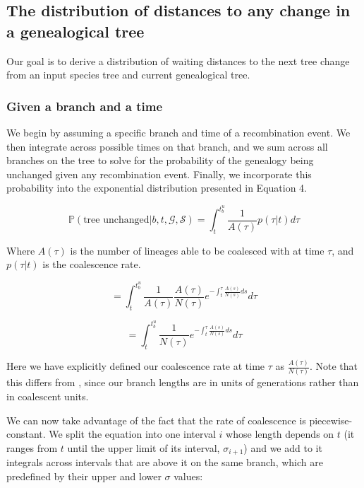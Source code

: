 \documentclass[11pt]{article}
\begin{document}
\subsection{The distribution of distances to any change in a genealogical tree}

Our goal is to derive a distribution of waiting distances to the next tree change from an input species tree and current genealogical tree.

\subsubsection{Given a branch and a time}

We begin by assuming a specific branch and time of a recombination event. We then integrate across possible times on that branch, and we sum across all branches on the tree to solve for the probability of the genealogy being unchanged given any recombination event. Finally, we incorporate this probability into the exponential distribution presented in Equation 4.

\begin{equation}
	\mathbb{P}(\textrm{tree unchanged} | b,t,\mathcal{G},\mathcal{S}) = \int_{t}^{t^u_b}\frac{1}{A(\tau)}p(\tau|t)d\tau
\end{equation}

Where $A(\tau)$ is the number of lineages able to be coalesced with at time $\tau$, and $p(\tau|t)$ is the coalescence rate.

\begin{equation}
	= \int_{t}^{t^u_b}\frac{1}{A(\tau)} \frac{A(\tau)}{N(\tau)}e^{-\int_t^\tau{}\frac{A(s)}{N(s)}ds} d\tau
\end{equation}


\begin{equation}
	= \int_{t}^{t^u_b}\frac{1}{N(\tau)}e^{-\int_t^\tau{}\frac{A(s)}{N(s)}ds} d\tau
\end{equation}

Here we have explicitly defined our coalescence rate at time $\tau$ as $\frac{A(\tau)}{N(\tau)}$. Note that this differs from \citet{deng_distribution_2021}, since our branch lengths are in units of generations rather than in coalescent units. 

We can now take advantage of the fact that the rate of coalescence is piecewise-constant. We split the equation into one interval $i$ whose length depends on $t$ (it ranges from $t$ until the upper limit of its interval, $\sigma_{i+1}$) and we add to it integrals across intervals that are above it on the same branch, which are predefined by their upper and lower $\sigma$ values:
\end{document}
